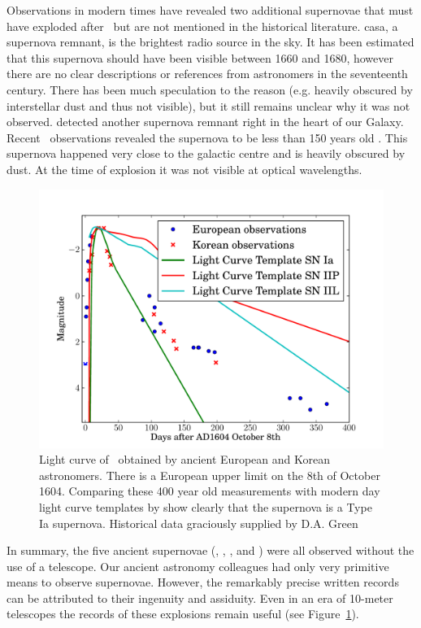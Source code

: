 Observations in modern times have revealed two additional supernovae that must have exploded after \ but are not mentioned in the historical literature. \gls{casa}, a supernova remnant, is the brightest radio source in the sky. It has been estimated that this supernova should have been visible between 1660 and 1680, however there are no clear descriptions or references from astronomers in the seventeenth century. There has been much speculation to the reason (e.g. heavily obscured by interstellar dust and thus not visible), but it still remains unclear why it was not observed. \citet{1984Natur.312..527G} detected another supernova remnant right in the heart of our Galaxy. Recent \xray\ observations revealed the supernova to be less than 150 years old \citep{2008ApJ...680L..41R}. This supernova happened very close to the galactic centre and is heavily obscured by dust. At the time of explosion it was not visible at optical wavelengths. 
\begin{figure}[tb] %
   \centering
   \includegraphics[width=\textwidth]{chapter_intro/plots/sn1604_ancient_lc.pdf} 
   \caption[Light curve of SN 1604]{Light curve of \ obtained by ancient European and Korean astronomers. There is a European upper limit on the 8th of October 1604. Comparing these 400 year old measurements with modern day light curve templates by \citet{2011MNRAS.412.1441L} show clearly that the supernova is a Type Ia supernova. Historical data graciously supplied by D.A. Green \citep{1977QB841.C58......, 2003LNP...598....7G}}
   \label{fig:sn1604_ancient_lc}
\end{figure}
In summary, the five ancient supernovae (, , ,  and ) were all observed without the use of a telescope. Our ancient astronomy colleagues had only very primitive means to observe supernovae. However, the remarkably precise written records can be attributed to their ingenuity and assiduity. Even in an era of 10-meter telescopes the records of these explosions remain useful (see Figure~\ref{fig:sn1604_ancient_lc}).




